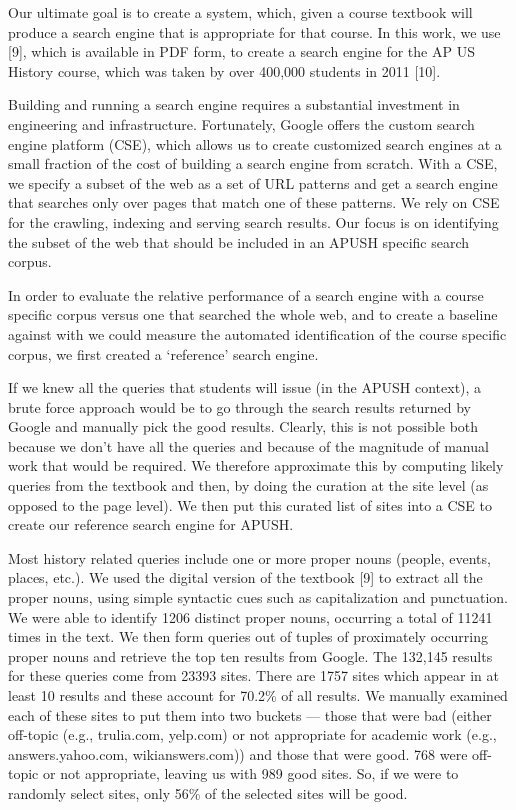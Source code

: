 \documentclass{acm_proc_article-sp}
\begin{document}
Our ultimate goal is to create a system, which, given a course textbook will
produce a search engine that is appropriate for that course. In this work, we
use [9], which is available in PDF form, to create a search engine for the AP US
History course, which was taken by over 400,000 students in 2011 [10]. 

Building and running a search engine requires a substantial investment in
engineering and infrastructure. Fortunately, Google offers the custom search
engine platform (CSE), which allows us to create customized search engines at a
small fraction of the cost of building a search engine from scratch. With a CSE,
we specify a subset of the web as a set of URL patterns and get a search engine
that searches only over pages that match one of these patterns. We rely on CSE
for the crawling, indexing and serving search results. Our focus is on
identifying the subset of the web that should be included in an APUSH specific
search corpus. 

In order to evaluate the relative performance of a search engine with a course
specific corpus versus one that searched the whole web, and to create a baseline
against with we could measure the automated identification of the course
specific corpus, we first created a ‘reference’ search engine. 

If we knew all the queries that students will issue (in the APUSH context), a
brute force approach would be to go through the search results returned by
Google and manually pick the good results. Clearly, this is not possible both
because we don’t have all the queries and because of the magnitude of manual
work that would be required. We therefore approximate this by computing likely
queries from the textbook and then, by doing the curation at the site level (as
opposed to the page level). We then put this curated list of sites into a CSE to
create our reference search engine for APUSH. 

Most history related queries include one or more proper nouns (people, events,
places, etc.). We used the digital version of the textbook [9] to extract all
the proper nouns, using simple syntactic cues such as capitalization and
punctuation. We were able to identify 1206 distinct proper nouns, occurring a
total of 11241 times in the text. We then form queries out of tuples of
proximately occurring proper nouns and retrieve the top ten results from
Google. The 132,145 results for these queries come from 23393 sites. There are
1757 sites which appear in at least 10 results and these account for 70.2\% of
all results. We manually examined each of these sites to put them into two
buckets --- those that were bad (either off-topic (e.g., trulia.com, yelp.com)
or not appropriate for academic work (e.g., answers.yahoo.com, wikianswers.com))
and those that were good. 768 were off-topic or not appropriate, leaving us with
989 good sites. So, if we were to randomly select sites, only 56\% of the
selected sites will be good. 
\end{document}
